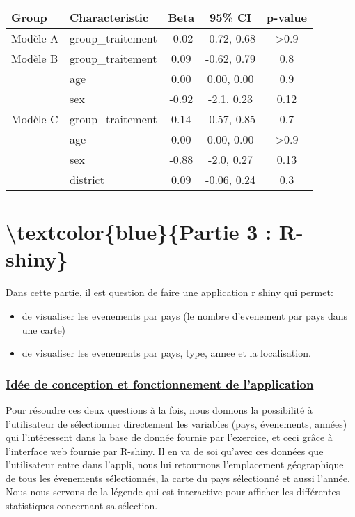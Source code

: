 \documentclass[
]{article}
\begin{document}
\begin{longtable}[]{@{}llccc@{}}
\toprule\noalign{}
\textbf{Group} & \textbf{Characteristic} & \textbf{Beta} & \textbf{95\%
CI} & \textbf{p-value} \\
\midrule\noalign{}
\endhead
\bottomrule\noalign{}
\endlastfoot
Modèle A & group\_traitement & -0.02 & -0.72, 0.68 & \textgreater0.9 \\
Modèle B & group\_traitement & 0.09 & -0.62, 0.79 & 0.8 \\
& age & 0.00 & 0.00, 0.00 & 0.9 \\
& sex & -0.92 & -2.1, 0.23 & 0.12 \\
Modèle C & group\_traitement & 0.14 & -0.57, 0.85 & 0.7 \\
& age & 0.00 & 0.00, 0.00 & \textgreater0.9 \\
& sex & -0.88 & -2.0, 0.27 & 0.13 \\
& district & 0.09 & -0.06, 0.24 & 0.3 \\
\end{longtable}

\hypertarget{textcolorbluepartie-3-r-shiny}{%
\section{\textbackslash textcolor\{blue\}\{Partie 3 :
R-shiny\}}\label{textcolorbluepartie-3-r-shiny}}

Dans cette partie, il est question de faire une application r shiny qui
permet:

\begin{itemize}
\item
  de visualiser les evenements par pays (le nombre d'evenement par pays
  dans une carte)
\item
  de visualiser les evenements par pays, type, annee et la localisation.
\end{itemize}

\hypertarget{section-2}{%
\subsubsection{\texorpdfstring{\underline{Idée de conception et fonctionnement de l'application}}{}}\label{section-2}}

Pour résoudre ces deux questions à la fois, nous donnons la possibilité
à l'utilisateur de sélectionner directement les variables (pays,
évenements, années) qui l'intéressent dans la base de donnée fournie par
l'exercice, et ceci grâce à l'interface web fournie par R-shiny. Il en
va de soi qu'avec ces données que l'utilisateur entre dans l'appli, nous
lui retournons l'emplacement géographique de tous les évenements
sélectionnés, la carte du pays sélectionné et aussi l'année. Nous nous
servons de la légende qui est interactive pour afficher les différentes
statistiques concernant sa sélection.
\end{document}

